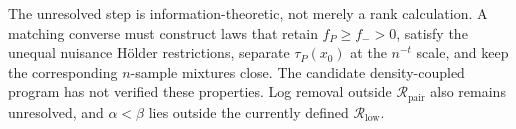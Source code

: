 The unresolved step is information-theoretic, not merely a rank calculation.  A matching converse must construct laws that retain \(f_P\geq f_->0\), satisfy the unequal nuisance H\"older restrictions, separate \(\tau_P(x_0)\) at the \(n^{-t}\) scale, and keep the corresponding \(n\)-sample mixtures close.  The candidate density-coupled program has not verified these properties.  Log removal outside \(\mathcal R_{\mathrm{pair}}\) also remains unresolved, and \(\alpha<\beta\) lies outside the currently defined \(\mathcal R_{\mathrm{low}}\).
